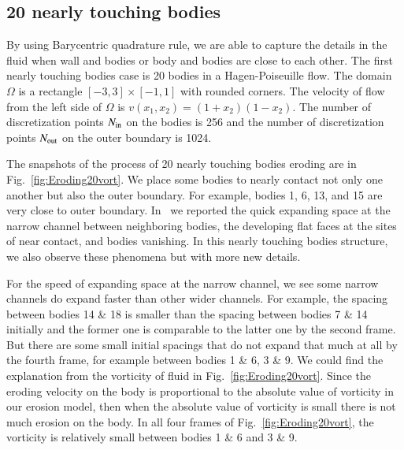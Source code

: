 \documentclass[preprint, 10pt]{elsarticle}
\begin{document}
\subsection{20 nearly touching bodies}
{\color{red} 
By using Barycentric quadrature rule, 
we are able to capture the details in the fluid when wall and bodies or body and bodies 
are close to each other. 
The first nearly touching bodies case is 20 bodies in a Hagen-Poiseuille flow. 
The domain $\Omega$ is a rectangle $[-3,3]\times[-1,1]$ with rounded corners. 
The velocity of flow from the left side of $\Omega$ is $v(x_1,x_2)=(1+x_2)(1-x_2)$. 
The number of discretization points $N_{\mathrm{in}}$ on the bodies is 256 and the number 
of discretization points $N_{\mathrm{out}}$ on the outer boundary is 1024. 

The snapshots of the process of 20 nearly touching bodies 
eroding are in Fig.~\ref{fig:Eroding20vort}. 
We place some bodies to nearly contact not only one another 
but also the outer boundary. For example, bodies 1, 6, 13, and 15 
are very close to outer boundary. In~\cite{qua-moo2018} 
we reported the quick expanding space at the narrow channel 
between neighboring bodies, the developing flat faces at the sites 
of near contact, and bodies vanishing. In this nearly touching bodies 
structure, we also observe these phenomena but with more new details.

For the speed of expanding space at the narrow channel, we see some 
narrow channels do expand faster than other wider channels. 
For example, the spacing between bodies 14 \& 18 is smaller 
than the spacing between bodies 7 \& 14 initially and the former one is 
comparable to the latter one by the second frame. But there are some 
small initial spacings that do not expand that much at all by the fourth frame, 
for example between bodies 1 \& 6, 3 \& 9. 
We could find the explanation from the vorticity of fluid 
in Fig.~\ref{fig:Eroding20vort}. 
Since the eroding velocity on the body is proportional to the 
absolute value of vorticity in our erosion model,  
then when the  absolute value of vorticity is small 
there is not much erosion on the body. 
In all four frames of Fig.~\ref{fig:Eroding20vort}, 
the vorticity is relatively small between bodies 1 \& 6 and 3 \& 9.

}
\end{document}
